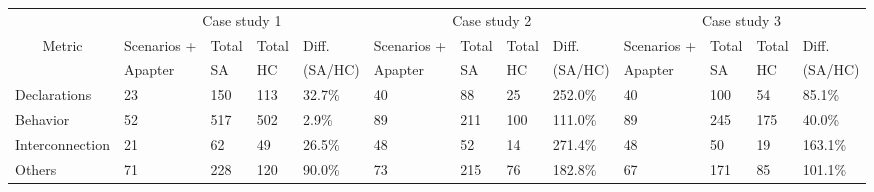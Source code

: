 
\begin{tabular}{|l||l|ll|l||l|ll|l||l|ll|l|}
\hline
                              & \multicolumn{4}{c||}{Case study 1}    & \multicolumn{4}{c||}{Case study 2}    & \multicolumn{4}{c|}{Case study 3}   \\
\cline{2-13}
\multicolumn{1}{|c||}{Metric} & Scenarios + & Total & Total & Diff.   & Scenarios + & Total & Total & Diff.   & Scenarios + & Total & Total & Diff.  \\
                              & Apapter     & SA    & HC    & (SA/HC) & Apapter     & SA    & HC    & (SA/HC) & Apapter     & SA    & HC    & (SA/HC)\\
\hline
Declarations                  & 23          & 150   & 113   & 32.7\%  & 40          & 88    & 25    & 252.0\% & 40          & 100   & 54    & 85.1\% \\
Behavior                      & 52          & 517   & 502   &  2.9\%  & 89          & 211   & 100   & 111.0\% & 89          & 245   & 175   & 40.0\% \\
Interconnection               & 21          & 62    & 49    & 26.5\%  & 48          & 52    & 14    & 271.4\% & 48          & 50    & 19    & 163.1\% \\
Others                        & 71          & 228   & 120   & 90.0\%  & 73          & 215   & 76    & 182.8\% & 67          & 171   & 85    & 101.1\% \\
\hline
\end{tabular}











